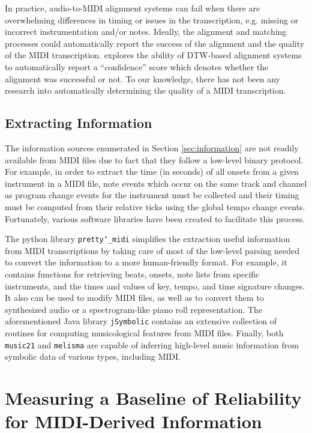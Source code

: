 \documentclass{article}
\begin{document}
In practice, audio-to-MIDI alignment systems can fail when there are overwhelming differences in timing or issues in the transcription, e.g. missing or incorrect instrumentation and/or notes.
Ideally, the alignment and matching processes could automatically report the success of the alignment and the quality of the MIDI transcription.
\cite{raffel2016optimizing} explores the ability of DTW-based alignment systems to automatically report a ``confidence'' score which denotes whether the alignment was successful or not.
To our knowledge, there has not been any research into automatically determining the quality of a MIDI transcription.

\subsection{Extracting Information}

The information sources enumerated in Section \ref{sec:information} are not readily available from MIDI files due to fact that they follow a low-level binary protocol.
For example, in order to extract the time (in seconds) of all onsets from a given instrument in a MIDI file, note events which occur on the same track and channel as program change events for the instrument must be collected and their timing must be computed from their relative ticks using the global tempo change events.
Fortunately, various software libraries have been created to facilitate this process.

The python library \texttt{pretty\char`_midi} \cite{raffel2014pretty_midi} simplifies the extraction useful information from MIDI transcriptions by taking care of most of the low-level parsing needed to convert the information to a more human-friendly format.
For example, it contains functions for retrieving beats, onsets, note lists from specific instruments, and the times and values of key, tempo, and time signature changes.
It also can be used to modify MIDI files, as well as to convert them to synthesized audio or a spectrogram-like piano roll representation.
The aforementioned Java library \texttt{jSymbolic} contains an extensive collection of routines for computing musicological features from MIDI files.
Finally, both \texttt{music21} and \texttt{melisma} are capable of inferring high-level music information from symbolic data of various types, including MIDI.

\section{Measuring a Baseline of Reliability for MIDI-Derived Information}
\label{sec:measuring}
\end{document}
